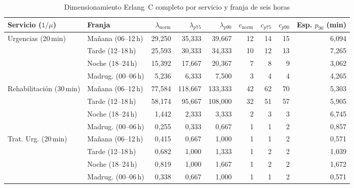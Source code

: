 \begin{table}[t]
\caption{Dimensionamiento Erlang~C completo por servicio y franja de seis horas}
\label{tab:anexo_erlang_12}
\centering
\scriptsize
\begin{tabularx}{\textwidth}{@{}L{0.21\textwidth} Y r r r r r r r@{}}
\toprule
Servicio ($1/\mu$) & Franja & $\lambda_{\text{norm}}$ & $\lambda_{p75}$ & $\lambda_{p90}$ & $c_{\text{norm}}$ & $c_{p75}$ & $c_{p90}$ & Esp. $p_{90}$ (min) \\
\midrule
Urgencias (20\,min) & Mañana (06--12\,h) & 29,250 & 35,333 & 39,667 & 12 & 14 & 15 & 6,094 \\
 & Tarde (12--18\,h) & 25,593 & 30,333 & 34,333 & 10 & 12 & 13 & 7,265 \\
 & Noche (18--24\,h) & 15,392 & 17,667 & 20,367 & 7 & 8 & 9 & 3,062 \\
 & Madrug. (00--06\,h) & 5,236 & 6,333 & 7,500 & 3 & 4 & 4 & 4,265 \\
\midrule
Rehabilitación (30\,min) & Mañana (06--12\,h) & 77,584 & 118,667 & 133,333 & 42 & 62 & 70 & 5,303 \\
 & Tarde (12--18\,h) & 58,174 & 95,667 & 108,000 & 32 & 51 & 57 & 5,905 \\
 & Noche (18--24\,h) & 1,442 & 2,333 & 3,333 & 2 & 3 & 3 & 6,745 \\
 & Madrug. (00--06\,h) & 0,255 & 0,333 & 0,667 & 1 & 1 & 2 & 0,857 \\
\midrule
Trat. Urg. (20\,min) & Mañana (06--12\,h) & 0,415 & 0,667 & 1,000 & 1 & 1 & 2 & 0,571 \\
 & Tarde (12--18\,h) & 0,682 & 1,000 & 1,333 & 1 & 2 & 2 & 1,039 \\
 & Noche (18--24\,h) & 0,819 & 1,000 & 1,667 & 1 & 2 & 2 & 1,672 \\
 & Madrug. (00--06\,h) & 0,338 & 0,667 & 1,000 & 1 & 1 & 2 & 0,571 \\
\bottomrule
\end{tabularx}
\end{table}

